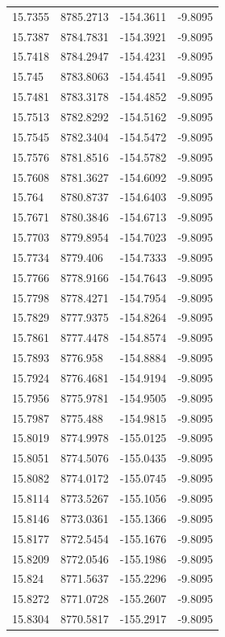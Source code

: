 \begin{table}[H]
\begin{tabular}{llll}
15.7355 & 8785.2713 & -154.3611 & -9.8095 \\
15.7387 & 8784.7831 & -154.3921 & -9.8095 \\
15.7418 & 8784.2947 & -154.4231 & -9.8095 \\
15.745 & 8783.8063 & -154.4541 & -9.8095 \\
15.7481 & 8783.3178 & -154.4852 & -9.8095 \\
15.7513 & 8782.8292 & -154.5162 & -9.8095 \\
15.7545 & 8782.3404 & -154.5472 & -9.8095 \\
15.7576 & 8781.8516 & -154.5782 & -9.8095 \\
15.7608 & 8781.3627 & -154.6092 & -9.8095 \\
15.764 & 8780.8737 & -154.6403 & -9.8095 \\
15.7671 & 8780.3846 & -154.6713 & -9.8095 \\
15.7703 & 8779.8954 & -154.7023 & -9.8095 \\
15.7734 & 8779.406 & -154.7333 & -9.8095 \\
15.7766 & 8778.9166 & -154.7643 & -9.8095 \\
15.7798 & 8778.4271 & -154.7954 & -9.8095 \\
15.7829 & 8777.9375 & -154.8264 & -9.8095 \\
15.7861 & 8777.4478 & -154.8574 & -9.8095 \\
15.7893 & 8776.958 & -154.8884 & -9.8095 \\
15.7924 & 8776.4681 & -154.9194 & -9.8095 \\
15.7956 & 8775.9781 & -154.9505 & -9.8095 \\
15.7987 & 8775.488 & -154.9815 & -9.8095 \\
15.8019 & 8774.9978 & -155.0125 & -9.8095 \\
15.8051 & 8774.5076 & -155.0435 & -9.8095 \\
15.8082 & 8774.0172 & -155.0745 & -9.8095 \\
15.8114 & 8773.5267 & -155.1056 & -9.8095 \\
15.8146 & 8773.0361 & -155.1366 & -9.8095 \\
15.8177 & 8772.5454 & -155.1676 & -9.8095 \\
15.8209 & 8772.0546 & -155.1986 & -9.8095 \\
15.824 & 8771.5637 & -155.2296 & -9.8095 \\
15.8272 & 8771.0728 & -155.2607 & -9.8095 \\
15.8304 & 8770.5817 & -155.2917 & -9.8095 \\

\end{tabular}
\end{table}
